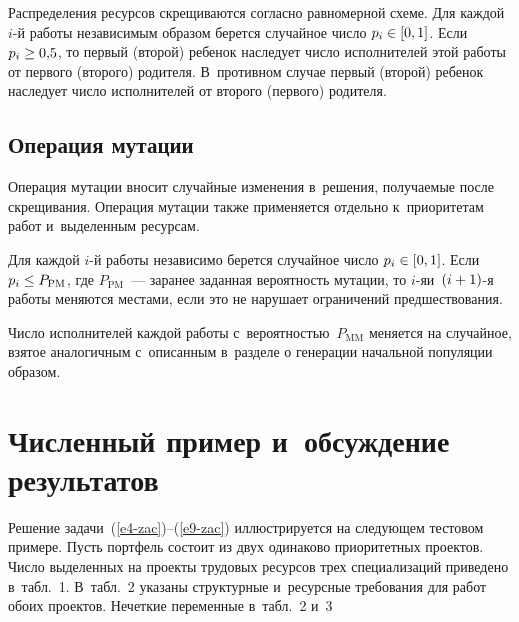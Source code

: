 \begin{multicols}{2}
  
  Распределения ресурсов скрещиваются согласно равномерной схеме. Для 
каждой $i$-й работы независимым образом берется случайное число $p_i\hm \in 
[0,1]$. Если $p_i\hm\geq 0{,}5$, то первый (второй) ребенок наследует число 
исполнителей этой работы от первого (второго) родителя. В~противном случае 
первый (второй) ребенок наследует число исполнителей от второго (первого) 
родителя.

\vspace*{-6pt}
  
  \subsection{Операция мутации}
  
  Операция мутации вносит случайные изменения в~решения, получаемые 
после скрещивания. Операция мутации также применяется отдельно 
к~приоритетам работ и~выделенным ресурсам.
  
  Для каждой $i$-й работы независимо берется случайное число $p_i\hm\in 
[0,1]$. Если $p_i\hm\leq P_{\mathrm{PM}}$, где $P_{\mathrm{PM}}$~--- заранее заданная 
вероятность мутации, то $i$-я\linebreak и~$(i\hm+1)$-я работы меняются местами, если 
это не нарушает ограничений предшествования.
  
  Число исполнителей каждой работы с~ве\-ро\-ят\-ностью~$P_{\mathrm{MM}}$ меняется на 
случайное, взятое аналогичным с~описанным в~разделе о генерации начальной 
популяции образом.

\vspace*{-6pt}
  
\section{Численный пример и~обсуждение результатов}

\vspace*{-2pt}
  
  Решение задачи~(\ref{e4-zac})--(\ref{e9-zac}) иллюстрируется на следующем 
тестовом примере. Пусть портфель состоит из двух одинаково приоритетных 
проектов. Число выделенных на проекты трудовых ресурсов трех 
специализаций приведено в~табл.~1. В~табл.~2 указаны структурные 
и~ресурсные требования для работ обоих проектов. Нечеткие переменные 
в~табл.~2 и~3\linebreak\vspace*{-12pt}

\pagebreak

\end{multicols}

